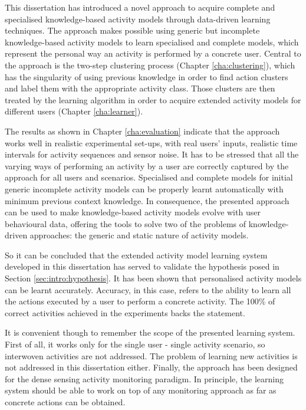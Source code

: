 This dissertation has introduced a novel approach to acquire complete and specialised knowledge-based activity models through data-driven learning techniques. The approach makes possible using generic but incomplete knowledge-based activity models to learn specialised and complete models, which represent the personal way an activity is performed by a concrete user. Central to the approach is the two-step clustering process (Chapter \ref{cha:clustering}), which has the singularity of using previous knowledge in order to find action clusters and label them with the appropriate activity class. Those clusters are then treated by the learning algorithm in order to acquire extended activity models for different users (Chapter \ref{cha:learner}).

The results as shown in Chapter \ref{cha:evaluation} indicate that the approach works well in realistic experimental set-ups, with real users' inputs, realistic time intervals for activity sequences and sensor noise. It has to be stressed that all the varying ways of performing an activity by a user are correctly captured by the approach for all users and scenarios. Specialised and complete models for initial generic incomplete activity models can be properly learnt automatically with minimum previous context knowledge. In consequence, the presented approach can be used to make knowledge-based activity models evolve with user behavioural data, offering the tools to solve two of the problems of knowledge-driven approaches: the generic and static nature of activity models.

So it can be concluded that the extended activity model learning system developed in this dissertation has served to validate the hypothesis posed in Section \ref{sec:intro:hypothesis}. It has been shown that personalised activity models can be learnt accurately. Accuracy, in this case, refers to the ability to learn all the actions executed by a user to perform a concrete activity. The 100\% of correct activities achieved in the experiments backs the statement.

It is convenient though to remember the scope of the presented learning system. First of all, it works only for the single user - single activity scenario, so interwoven activities are not addressed. The problem of learning new activities is not addressed in this dissertation either. Finally, the approach has been designed for the dense sensing activity monitoring paradigm. In principle, the learning system should be able to work on top of any monitoring approach as far as concrete actions can be obtained.

